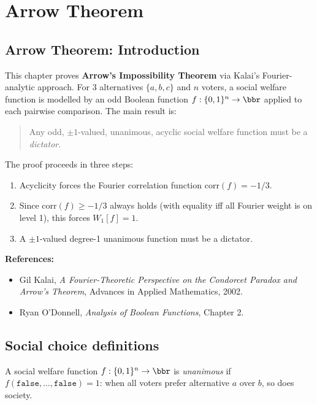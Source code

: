 \section{Arrow Theorem}
\subsection*{Arrow Theorem: Introduction}

This chapter proves \textbf{Arrow's Impossibility Theorem} via Kalai's
Fourier-analytic approach.  For 3 alternatives $\{a,b,c\}$ and $n$ voters,
a social welfare function is modelled by an odd Boolean function
$f:\{0,1\}^n\to\bbr$ applied to each pairwise comparison.  The main result is:

\begin{quote}
Any odd, $\pm 1$-valued, unanimous, acyclic social welfare function must be a
\emph{dictator}.
\end{quote}

The proof proceeds in three steps:
\begin{enumerate}
  \item Acyclicity forces the Fourier correlation function $\mathrm{corr}(f) = -1/3$.
  \item Since $\mathrm{corr}(f)\ge -1/3$ always holds (with equality iff all
        Fourier weight is on level 1), this forces $W_1[f] = 1$.
  \item A $\pm 1$-valued degree-1 unanimous function must be a dictator.
\end{enumerate}

\textbf{References:}
\begin{itemize}
  \item Gil Kalai, \emph{A Fourier-Theoretic Perspective on the Condorcet
        Paradox and Arrow's Theorem}, Advances in Applied Mathematics, 2002.
  \item Ryan O'Donnell, \emph{Analysis of Boolean Functions}, Chapter 2.
\end{itemize}

\subsection{Social choice definitions}

\begin{definition}[Unanimity]
\label{ArrowTheorem.unanimity}
\leanok
{}
A social welfare function $f:\{0,1\}^n\to\bbr$ is \emph{unanimous} if
$f(\texttt{false},\dots,\texttt{false}) = 1$: when all voters prefer
alternative $a$ over $b$, so does society.
\end{definition}

